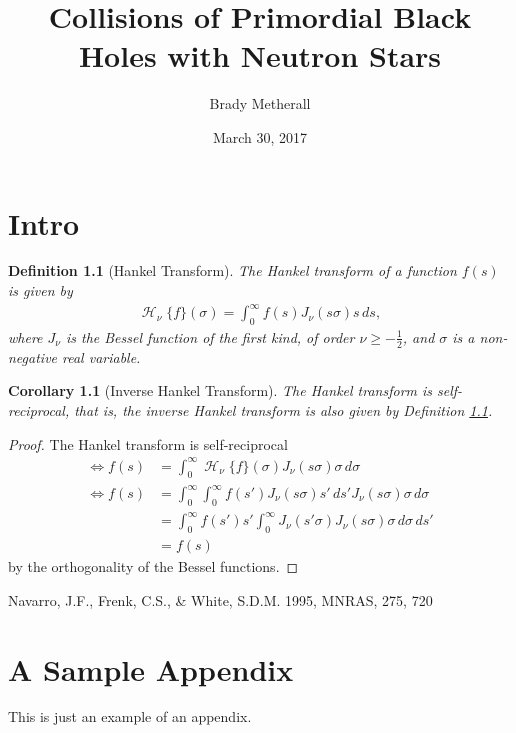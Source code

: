 \documentclass{jthesis}
\title{Collisions of Primordial Black Holes with Neutron Stars} %
\author{Brady Metherall}
\date{March 30, 2017}
\DeclareMathOperator{\Hsign}{\mathscr{H}}
\newcommand\Hank[2][0]{{\Hsign_{#1} \{ #2 \} }}
\newtheorem{definition}[theorem]{Definition}
\newtheorem{corollary}[theorem]{Corollary}
\begin{document}
\maketitle



\makedeclaration

\maketableofcontents

\doublespacing

\chapter{Intro}

\begin{definition}[Hankel Transform]
\label{def:hanktrans}
The Hankel transform of a function $f(s)$ is given by
\begin{align*}
\Hank[\nu]{f}(\sigma) = \int_0^\infty f(s) J_\nu(s \sigma) s \, ds,
\end{align*}
where $J_\nu$ is the Bessel function of the first kind, of order $\nu \geq -\frac{1}{2}$, and $\sigma$ is a non-negative real variable.
\end{definition}

\begin{corollary}[Inverse Hankel Transform]
\label{def:invhanktrans}
The Hankel transform is self-reciprocal, that is, the inverse Hankel transform is also given by Definition \ref{def:hanktrans}.
\end{corollary}
\begin{proof}
The Hankel transform is self-reciprocal
\begin{align*}
\iff f(s) &= \int_0^\infty \Hank[\nu]{f}(\sigma) J_\nu(s \sigma) \sigma \, d\sigma \\
\iff f(s) &= \int_0^\infty \int_0^\infty f(s') J_\nu(s \sigma) s' \, ds' J_\nu(s \sigma) \sigma \, d\sigma \\
&= \int_0^\infty f(s') s' \int_0^\infty J_\nu(s' \sigma) J_\nu(s \sigma) \sigma \, d\sigma \, ds' \\
&= f(s)
\end{align*}
by the orthogonality of the Bessel functions.
\end{proof}


%

\begin{thebibliography}{}

 Navarro, J.F., Frenk, C.S., \& White, S.D.M.  1995, MNRAS, 275, 720

\end{thebibliography}

\appendix

\chapter{A Sample Appendix}
\label{app:sample}

This is just an example of an appendix.
\end{document}

